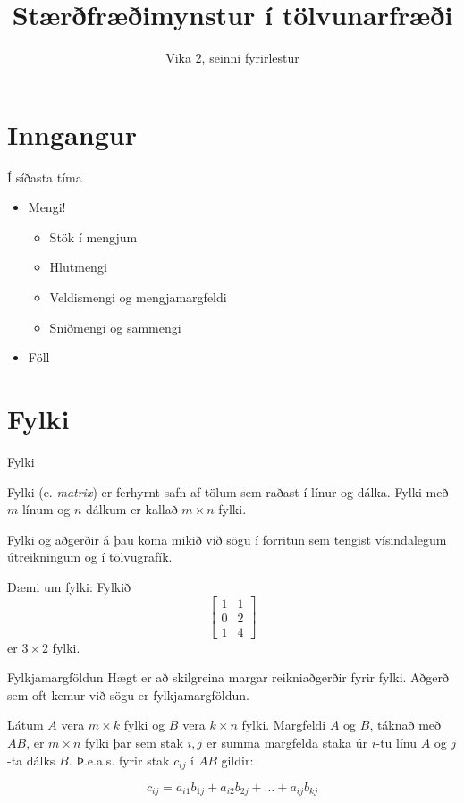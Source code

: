 \documentclass{beamer}
\title{Stærðfræðimynstur í tölvunarfræði}
\subtitle{Vika 2, seinni fyrirlestur}
\begin{document}
\begin{frame}
\titlepage
\end{frame}

\section{Inngangur}

\begin{frame}{Í síðasta tíma}
\begin{itemize}
 \item Mengi!
 \begin{itemize}
  \item Stök í mengjum
  \item Hlutmengi
  \item Veldismengi og mengjamargfeldi
  \item Sniðmengi og sammengi
 \end{itemize}
 \item Föll 
\end{itemize}
\end{frame}

\section{Fylki}

\begin{frame}{Fylki}
\begin{tcolorbox}[title=Fylki]
Fylki (e. \emph{matrix}) er ferhyrnt safn af tölum sem raðast í línur og dálka. Fylki með $m$ línum og $n$ dálkum er kallað $m \times n$ fylki.
\end{tcolorbox}
Fylki og aðgerðir á þau koma mikið við sögu í forritun sem tengist vísindalegum útreikningum og í tölvugrafík.

Dæmi um fylki: Fylkið
\[
\begin{bmatrix}
1&1\\0&2\\1&4
\end{bmatrix}
\]
er $3 \times 2$ fylki.
\end{frame}

\begin{frame}{Fylkjamargföldun}
Hægt er að skilgreina margar reikniaðgerðir fyrir fylki. Aðgerð sem oft kemur við sögu er fylkjamargföldun.

\begin{tcolorbox}[title=Fylkjamargföldun]
Látum $A$ vera $m \times k$ fylki og $B$ vera $k \times n$ fylki. Margfeldi $A$ og $B$, táknað með $AB$, er $m \times n$ fylki þar sem stak $i, j$ er summa margfelda staka úr $i$-tu línu $A$ og $j$-ta dálks $B$. Þ.e.a.s. fyrir stak $c_{ij}$ í $AB$ gildir:

\[
 c_{ij} = a_{i1}b_{1j} + a_{i2}b_{2j} + \ldots + a_{ij}b_{kj}
\]
\end{tcolorbox}
\end{frame}
\end{document}
